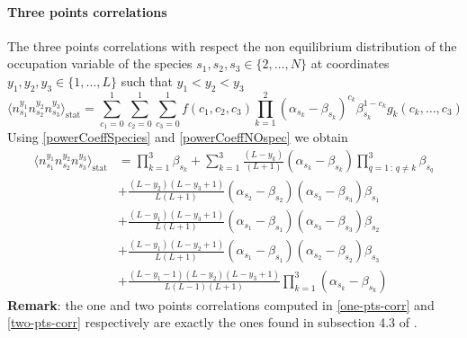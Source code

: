 \documentclass[11pt]{article}
\numberwithin{equation}{section}
\numberwithin{equation}{subsection}
\begin{document}
\paragraph{Three points correlations}
The three points correlations with respect the non equilibrium distribution of the occupation variable of the species $s_{1},s_{2},s_{3}\in \{2,\ldots,N\}$ at coordinates $y_{1},y_{2},y_{3}\in \{1,\ldots,L\}$ such that $y_{1}<y_{2}<y_{3}$
\begin{equation}
    \langle n_{s_{1}}^{y_{1}}n_{s_{2}}^{y_{2}}n_{s_{3}}^{y_{3}}\rangle_{\text{stat}}=\sum_{c_{1}=0}^{1}\sum_{c_{2}=0}^{1}\sum_{c_{3}=0}^{1}f(c_{1},c_{2},c_{3})\prod_{k=1}^{2}(\alpha_{s_{k}}-\beta_{s_{k}})^{c_{k}}\beta_{s_{k}}^{1-c_{k}}g_{k}(c_{k},\ldots,c_{3})
\end{equation}
Using \eqref{powerCoeffSpecies} and \eqref{powerCoeffNOspec} we obtain 
\begin{equation}\label{three-pts-corr}
    \begin{split}
        \langle n_{s_{1}}^{y_{1}}n_{s_{2}}^{y_{2}}n_{s_{3}}^{y_{3}}\rangle_{\text{stat}}&=\prod_{k=1}^{3}\beta_{s_{k}}+\sum_{k=1}^{3}\frac{(L-y_{k})}{(L+1)}(\alpha_{s_{k}}-\beta_{s_{k}})\prod_{q=1\,:\,q\neq k}^{3}\beta_{s_{q}}
        \\&+
        \frac{(L-y_{2})(L-y_{3}+1)}{L(L+1)}(\alpha_{s_{2}}-\beta_{s_{2}})(\alpha_{s_{3}}-\beta_{s_{3}})\beta_{s_{1}}
        \\&+
        \frac{(L-y_{1})(L-y_{3}+1)}{L(L+1)}(\alpha_{s_{1}}-\beta_{s_{1}})(\alpha_{s_{3}}-\beta_{s_{3}})\beta_{s_{2}}
        \\&+
        \frac{(L-y_{1})(L-y_{2}+1)}{L(L+1)}(\alpha_{s_{1}}-\beta_{s_{1}})(\alpha_{s_{2}}-\beta_{s_{2}})\beta_{s_{3}}
        \\&+
        \frac{(L-y_{1}-1)(L-y_{2})(L-y_{3}+1)}{L(L-1)(L+1)}\prod_{k=1}^{3}(\alpha_{s_{k}}-\beta_{s_{k}})
    \end{split}
\end{equation}
\textbf{Remark}: the one and two points correlations computed in \eqref{one-pts-corr} and \eqref{two-pts-corr} respectively are exactly the ones found in subsection 4.3 of \cite{vanicat2017exact}. 
\end{document}
